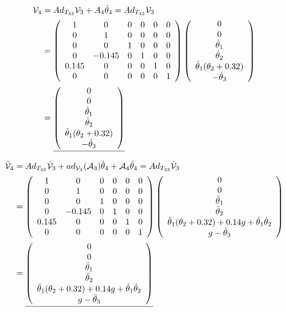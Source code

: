 \documentclass[]{scrreprt}
\newcommand{\myvec}[1]{\left(\begin{array}{c}#1\end{array}\right)}
\begin{document}
\begin{align*}
\mathcal{V}_4 &= Ad_{T_{43}}\mathcal{V}_3 + A_4\dot{\theta}_4 = Ad_{T_{43}}\mathcal{V}_3\\
& = \left(\begin{array}{cccccc}
1 & 0 & 0 & 0 & 0 & 0 \\
0 & 1 & 0 & 0 & 0 & 0 \\
0 & 0 & 1 & 0 & 0 & 0 \\
0 & -0.145 & 0 & 1 & 0 & 0 \\
0.145 & 0 & 0 & 0 & 1 & 0 \\
0 & 0 & 0 & 0 & 0 & 1
\end{array}\right)
\myvec{0\\ 0\\ \tdot{1}\\\tdot{2}\\\dot{\theta}_1(\theta_2+0.32)\\-\tdot{3}}\\
&= \underline{\myvec{0\\ 0\\ \tdot{1}\\\tdot{2}\\\dot{\theta}_1(\theta_2+0.32)\\-\tdot{3}}}
\end{align*}         

\begin{align*}
\vdot{4} &= Ad_{T_{43}}\vdot{3} + ad_{\mathcal{V}_4}(\mathcal{A}_3)\dot{\theta}_4+\mathcal{A}_4\ddot{\theta}_4 = Ad_{T_{43}}\vdot{3}\\
& = \left(\begin{array}{cccccc}
1 & 0 & 0 & 0 & 0 & 0 \\
0 & 1 & 0 & 0 & 0 & 0 \\
0 & 0 & 1 & 0 & 0 & 0 \\
0 & -0.145 & 0 & 1 & 0 & 0 \\
0.145 & 0 & 0 & 0 & 1 & 0 \\
0 & 0 & 0 & 0 & 0 & 1
\end{array}\right)
\myvec{0\\0\\\tddot{1}\\\tddot{2}\\\tddot{1}(\theta_2+0.32)+0.14g+\tdot{1}\tdot{2}\\g-\tddot{3}}\\
&= \underline{\myvec{0\\0\\\tddot{1}\\\tddot{2}\\\tddot{1}(\theta_2+0.32)+0.14g+\tdot{1}\tdot{2}\\g-\tddot{3}}}
\end{align*}
\end{document}

